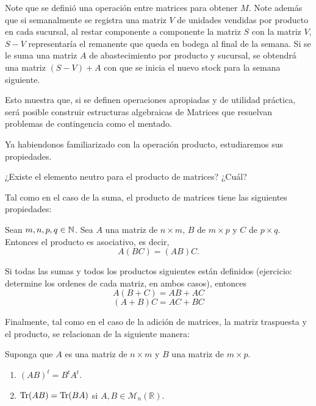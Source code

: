 \begin{ejem}
Note que se definió una operación entre matrices para obtener $M$. Note además que
si semanalmente se registra una matriz $V$ de unidades vendidas por producto en cada
sucursal, al restar componente a componente la matriz $S$ con la matriz $V$, $S-V$ representaría
el remanente que queda en bodega al final de la semana. Si se le suma una matriz $A$ de
abastecimiento por producto y sucursal, se obtendrá una matriz $(S-V) + A$ con que se inicia
el nuevo stock para la semana siguiente.

Esto muestra que, si se definen operaciones apropiadas y de utilidad práctica, será
posible construir estructuras algebraicas de Matrices que resuelvan problemas de
contingencia como el mentado.
\end{ejem}

Ya habiendonos familiarizado con la operaci\'on producto, estudiaremos sus propiedades.

\begin{ejer}
    ¿Existe el elemento neutro para el producto de matrices? ¿Cu\'al?
\end{ejer}

Tal como en el caso de la suma, el producto de matrices tiene las siguientes propiedades:
\begin{thm}[Asociatividad]
Sean $m,n,p,q \in \mathbb{N}$. Sea $A$ una matriz de $n \times m$, $B$ de $m \times p$ y $C$ de $p \times q$. Entonces el producto es asociativo, es decir,
$$A(BC) = (AB)C.$$
\end{thm}
\begin{thm}[Distributividad]

Si todas las sumas y todos los productos siguientes están definidos (ejercicio: determine los ordenes de cada matriz, en ambos casos), entonces 
$$A(B+C) = AB+AC$$  $$(A+B)C = AC + BC$$
\end{thm}




Finalmente, tal como en el caso de la adici\'on de matrices, la matriz traspuesta y el producto, se relacionan de la siguiente manera:
\begin{thm}
Suponga que $A$ es una matriz de $n \times m$ y $B$ una matriz de $m \times p$.

\begin{enumerate}
\item
$(AB)^t = B^t A^t$.
\item $\operatorname{Tr}(AB)=
\operatorname{Tr}(BA)$ si $A, B\in \mathcal{M}_n(\mathbb{R})$.
\end{enumerate}
\end{thm}

